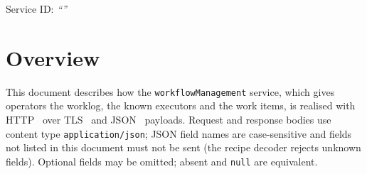 \documentclass[a4paper]{arrowhead}
\begin{document}
\ArrowheadSetup

\begin{center}
  \vspace*{1cm}
  \huge{\arrowtitle}

  \vspace*{0.2cm}
  \LARGE{\arrowtype}
  \vspace*{1cm}

  \Large{Service ID: \textit{``\arrowid''}}
  \vspace*{\fill}

  

  \vspace*{1cm}
  \vspace*{\fill}

  \begin{abstract}
    This document describes the HTTP/TLS/JSON interface of the \texttt{workflow\allowbreak{}Management} service of the Eclipse Arrowhead workflow support systems, service version 1.0.0, documentation edition 5.4.0. It realises the abstract operations of the \texttt{workflow\allowbreak{}Management} SD.
  \end{abstract}

  \vspace*{1cm}
\end{center}

\newpage

\tableofcontents
\newpage

\section{Overview}
\label{sec:overview}
This document describes how the \texttt{workflow\allowbreak{}Management} service, which gives operators the worklog, the known executors and the work items, is realised with HTTP~\cite{rfc9110}
over TLS~\cite{rfc8446} and JSON~\cite{rfc8259} payloads. Request and response bodies use content type
\texttt{application/\allowbreak{}json}; JSON field names are case-sensitive and fields not listed in this document must not be sent
(the recipe decoder rejects unknown fields). Optional fields may be omitted; absent and \texttt{null} are equivalent.
\end{document}
